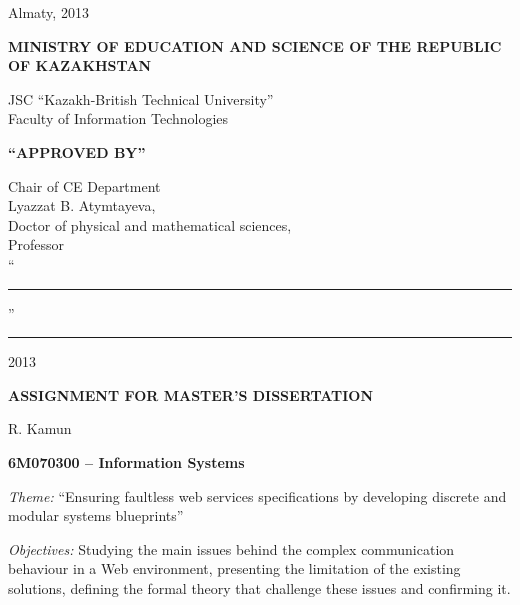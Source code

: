 \begin{titlepage}
\begin{center}
    \end{center}


    \begin{center}
        \vfill
        Almaty, 2013
    \end{center}

    \pagebreak


    \begin{center}
    {\bf{\MakeUppercase{Ministry of education and science of the republic of Kazakhstan}}

        \vspace{14pt}

        JSC ``Kazakh-British Technical University''\\
        Faculty of Information Technologies}

        \vspace{14pt}
        
        \begin{flushright}
            {\bf \MakeUppercase{``Approved by''}}

            Chair of CE Department\\
            Lyazzat B. Atymtayeva,\\
            Doctor of physical and mathematical sciences,\\
            Professor\\

            \vspace{0.5\baselineskip}
            ``\rule{2em}{0.4pt}'' \rule{8em}{0.4pt} 2013\\
            \end{flushright}
        
        {\bf
        \MakeUppercase{Assignment for master's dissertation}}

    \end{center}

    \setlength{\parindent}{0pt}
    \setlength{\parskip}{1ex plus 0.5ex minus 0.2ex}

    R. Kamun

    {\bf 6M070300 -- Information Systems}

    \emph{Theme:} ``Ensuring faultless web services specifications by developing discrete and modular systems blueprints''
    
   \emph{Objectives:}
   Studying the main issues behind the complex communication behaviour in a Web environment, presenting the limitation of the existing solutions, defining the formal theory that challenge these issues and confirming it.
    

\end{titlepage}
